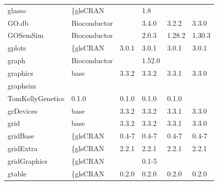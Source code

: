 \begin{longtable}{llllll}
\rowcolor{black!10}
glasso                        & \{gls{CRAN}                      &             & 1.8         &                &                   \\
\rowcolor{black!5}
GO.db                         & Bioconductor              &             & 3.4.0       & 3.2.2          & 3.3.0              \\
\rowcolor{black!10}
GOSemSim                      & Bioconductor              &             & 2.0.3       & 1.28.2         & 1.30.3            \\
\rowcolor{black!5}
gplots                        & \{gls{CRAN}                      & 3.0.1       & 3.0.1       & 3.0.1          & 3.0.1              \\
\rowcolor{black!10}
graph                         & Bioconductor              &             & 1.52.0      &                &                   \\
\rowcolor{black!5}
graphics                      & base                      & 3.3.2       & 3.3.2       & 3.3.1          & 3.3.0              \\
\rowcolor{black!10}
graphsim                      & \begin{tabular}[c]{@{}l@{}}GitHub \\ TomKellyGenetics \end{tabular}  & 0.1.0       & 0.1.0       & 0.1.0          & 0.1.0             \\
\rowcolor{black!5}
grDevices                     & base                      & 3.3.2       & 3.3.2       & 3.3.1          & 3.3.0              \\
\rowcolor{black!10}
grid                          & base                      & 3.3.2       & 3.3.2       & 3.3.1          & 3.3.0             \\
\rowcolor{black!5}
gridBase                      & \{gls{CRAN}                      & 0.4-7       & 0.4-7       & 0.4-7          & 0.4-7              \\
\rowcolor{black!10}
gridExtra                     & \{gls{CRAN}                      & 2.2.1       & 2.2.1       & 2.2.1          & 2.2.1             \\
\rowcolor{black!5}
gridGraphics                  & \{gls{CRAN}                      &             & 0.1-5       &                &                    \\
\rowcolor{black!10}
gtable                        & \{gls{CRAN}                      & 0.2.0       & 0.2.0       & 0.2.0          & 0.2.0             \\

\end{longtable}
